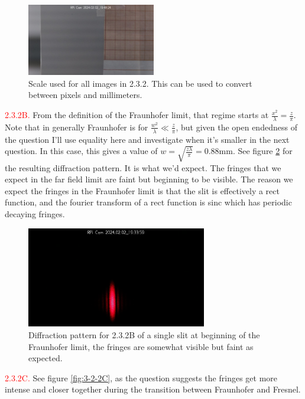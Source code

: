 \documentclass[letterpaper, reqno,11pt]{article}
\begin{document}
\begin{figure}[tb]
    \centering
    \includegraphics[width=0.5\textwidth]{Fourier/scale.jpeg}
    \caption{Scale used for all images in 2.3.2. This can be used to convert between pixels and millimeters.}
    \label{fig:2-3-2A}
\end{figure}

\noindent \textcolor{red}{2.3.2B.} From the definition of the Fraunhofer limit, that regime starts at $\frac{x^2}{\lambda}=\frac{z}{\pi}$. Note that in generally Fraunhofer is for $\frac{w^2}{\lambda}\ll\frac{z}{\pi}$, but given the open endedness of the question I'll use equality here and investigate when it's smaller in the next question. In this case, this gives a value of $w= \sqrt{ \frac{z\lambda}{\pi}}=0.88$mm. See figure \ref{fig:2-3-2B} for the resulting diffraction pattern. It is what we'd expect. The fringes that we expect in the far field limit are faint but beginning to be visible. The reason we expect the fringes in the Fraunhofer limit is that the slit is effectively a rect function, and the fourier transform of a rect function is sinc which has periodic decaying fringes.

\begin{figure}[tb]
    \centering
    \includegraphics[width=0.7\textwidth]{Fourier/1_redo/media/im_0253_20240202_193359.jpg}
    \caption{Diffraction pattern for 2.3.2B of a single slit at beginning of the Fraunhofer limit, the fringes are somewhat visible but faint as expected.}
    \label{fig:2-3-2B}
\end{figure}

\noindent \textcolor{red}{2.3.2C.} See figure \ref{fig:3-2-2C}, as the question suggests the fringes get more intense and closer together during the transition between Fraunhofer and Fresnel.
\end{document}
